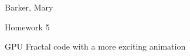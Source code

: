 \documentclass{article}
\def \hwnum{5}
\def \hwdescription{GPU Fractal code with a more exciting animation}
\def \hwscript{hw05.cu}
\begin{document}
{\color{white}{thing}}
\begin{center}
{
	\fontsize{20pt}{20pt}\selectfont
	Barker, Mary
}

\vspace{1cm}

{
	\fontsize{20pt}{20pt}\selectfont
	Homework \hwnum
}

\vspace{1cm}

{
	\fontsize{20pt}{20pt}\selectfont
	\hwdescription
}

\end{center}
\pagebreak

\end{document}
